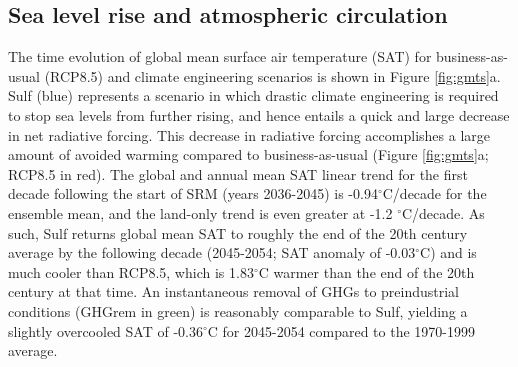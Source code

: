 \documentclass[draft,grl]{AGUTeX}  %
\begin{document}
\begin{article}

\section{Sea level rise and atmospheric circulation}

The time evolution of global mean surface air temperature (SAT) for business-as-usual (RCP8.5) and climate engineering scenarios is shown in Figure \ref{fig:gmts}a. Sulf (blue) represents a scenario in which drastic climate engineering is required to stop sea levels from further rising, and hence entails a quick and large decrease in net radiative forcing. This decrease in radiative forcing accomplishes a large amount of avoided warming compared to business-as-usual (Figure \ref{fig:gmts}a; RCP8.5 in red). The global and annual mean SAT linear trend for the first decade following the start of SRM (years 2036-2045) is -0.94$^\circ$C/decade for the ensemble mean, and the land-only trend is even greater at -1.2 $^\circ$C/decade. As such, Sulf returns global mean SAT to roughly the end of the 20th century average by the following decade (2045-2054; SAT anomaly of -0.03$^\circ$C) and is much cooler than RCP8.5, which is 1.83$^\circ$C warmer than the end of the 20th century at that time. An instantaneous removal of GHGs to preindustrial conditions (GHGrem in green) is reasonably comparable to Sulf, yielding a slightly overcooled SAT of -0.36$^\circ$C for 2045-2054 compared to the 1970-1999 average. %


\end{article}
\end{document}
